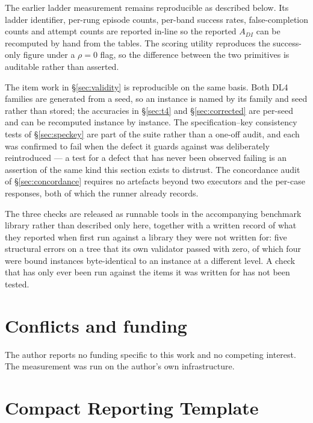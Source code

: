 \documentclass[11pt]{article}
\theoremstyle{definition}
\begin{document}
The earlier ladder measurement remains reproducible as described below. Its ladder identifier, per-rung episode counts, per-band success rates, false-completion counts and attempt counts are reported in-line so the reported $A_{DI}$ can be recomputed by hand from the tables. The scoring utility reproduces the success-only figure under a $\rho = 0$ flag, so the difference between the two primitives is auditable rather than asserted.

The item work in \S\ref{sec:validity} is reproducible on the same basis. Both DL4 families are generated from a seed, so an instance is named by its family and seed rather than stored; the accuracies in \S\ref{sec:t4} and \S\ref{sec:corrected} are per-seed and can be recomputed instance by instance. The specification--key consistency tests of \S\ref{sec:speckey} are part of the suite rather than a one-off audit, and each was confirmed to fail when the defect it guards against was deliberately reintroduced --- a test for a defect that has never been observed failing is an assertion of the same kind this section exists to distrust. The concordance audit of \S\ref{sec:concordance} requires no artefacts beyond two executors and the per-case responses, both of which the runner already records.

The three checks are released as runnable tools in the accompanying benchmark library rather than described only here, together with a written record of what they reported when first run against a library they were not written for: five structural errors on a tree that its own validator passed with zero, of which four were bound instances byte-identical to an instance at a different level. A check that has only ever been run against the items it was written for has not been tested.

\section*{Conflicts and funding}

The author reports no funding specific to this work and no competing interest. The measurement was run on the author's own infrastructure.




\appendix

\section{Compact Reporting Template}
\end{document}
